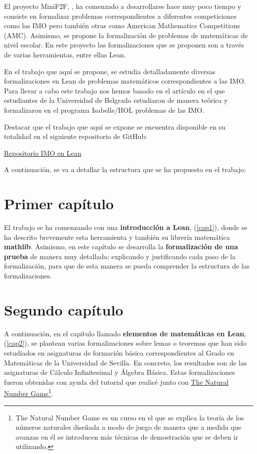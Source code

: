 El proyecto MiniF2F, \cite{mini}, ha comenzado a desarrollarse hace muy
poco tiempo y consiste en formalizar problemas correspondientes a
diferentes competiciones como las IMO pero también otras como American
Mathematics Competitions (AMC). Asimismo, se propone la formalización de
problemas de matemáticas de nivel escolar. En este proyecto las
formalizaciones que se proponen son a través de varias herramientas,
entre ellas Lean.

En el trabajo que aquí se propone, se estudia detalladamente diversas
formalizaciones en Lean de problemas matemáticos correspondientes a las
IMO. Para llevar a cabo este trabajo nos hemos basado en el artículo
\cite{ART} en el que estudiantes de la Universidad de Belgrado
estudiaron de manera teórica y formalizaron en el programa Isabelle/HOL
problemas de las IMO.

Destacar que el trabajo que aquí se expone se encuentra disponible en
su totalidad en el siguiente repositorio de GitHub:

\begin{center}
\href{https://github.com/saradiazr11/IMO_en_Lean}{Repositorio IMO en Lean}
\end{center}

A continuación, se va a detallar la estructura que se ha propuesto en
el trabajo:

\section*{Primer capítulo}

El trabajo se ha comenzando con una \textbf{introducción a Lean},
(\ref{cap1}), donde se ha descrito brevemente esta herramienta y también
su librería matemática \textbf{mathlib}. Asimismo, en este capítulo se
desarrolla la \textbf{formalización de una prueba} de manera muy
detallada: explicando y justificando cada paso de la formalización, para
que de esta manera se pueda comprender la estructura de las
formalizaciones.

\section*{Segundo capítulo}

A continuación, en el capítulo llamado \textbf{elementos de matemáticas
  en Lean}, (\ref{cap2}), se plantean varias formalizaciones sobre lemas
o teoremas que han sido estudiados en asignaturas de formación básica
correspondientes al Grado en Matemáticas de la Universidad de Sevilla.
En concreto, los resultados son de las asignaturas de Cálculo
Infinitesimal y Álgebra Básica. Estas formalizaciones fueron obtenidas
con ayuda del tutorial \cite{tutor} que realicé junto con
\href{https://www.ma.imperial.ac.uk/~buzzard/xena/natural_number_game/}{The
  Natural Number Game}\footnote{The Natural Number Game es un curso en
  el que se explica la teoría de los números naturales diseñada a modo
  de juego de manera que a medida que avanzas en él se introducen más
  técnicas de demostración que se deben ir utilizando.}.

